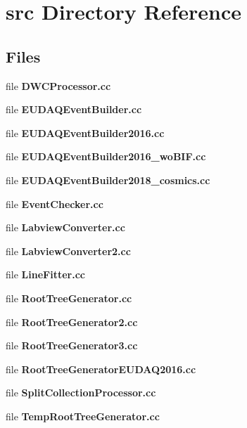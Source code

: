 \section{src Directory Reference}
\label{dir_a3c80b85a39181ec567e7590f60ee26d}
\subsection*{Files}
\begin{DoxyCompactItemize}
\item 
file {\bfseries D\-W\-C\-Processor.\-cc}
\item 
file {\bfseries E\-U\-D\-A\-Q\-Event\-Builder.\-cc}
\item 
file {\bfseries E\-U\-D\-A\-Q\-Event\-Builder2016.\-cc}
\item 
file {\bfseries E\-U\-D\-A\-Q\-Event\-Builder2016\-\_\-wo\-B\-I\-F.\-cc}
\item 
file {\bfseries E\-U\-D\-A\-Q\-Event\-Builder2018\-\_\-cosmics.\-cc}
\item 
file {\bfseries Event\-Checker.\-cc}
\item 
file {\bfseries Labview\-Converter.\-cc}
\item 
file {\bfseries Labview\-Converter2.\-cc}
\item 
file {\bfseries Line\-Fitter.\-cc}
\item 
file {\bfseries Root\-Tree\-Generator.\-cc}
\item 
file {\bfseries Root\-Tree\-Generator2.\-cc}
\item 
file {\bfseries Root\-Tree\-Generator3.\-cc}
\item 
file {\bfseries Root\-Tree\-Generator\-E\-U\-D\-A\-Q2016.\-cc}
\item 
file {\bfseries Split\-Collection\-Processor.\-cc}
\item 
file {\bfseries Temp\-Root\-Tree\-Generator.\-cc}
\end{DoxyCompactItemize}
